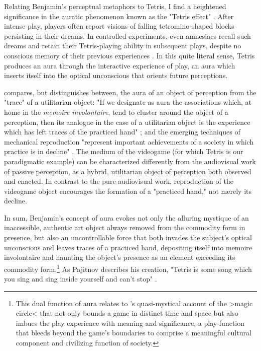 Relating Benjamin's perceptual metaphors to Tetris, I find a heightened significance in the auratic phenomenon known as the "Tetris effect" \autocite{Goldsmith1994}. After intense play, players often report visions of falling tetromino-shaped blocks persisting in their dreams. In controlled experiments, even amnesiacs recall such dreams and retain their Tetris-playing ability in subsequent plays, despite no conscious memory of their previous experiences \autocite{Stickgold2000-mv}. In this quite literal sense, Tetris produces an aura through the interactive experience of play, an aura which inserts itself into the optical unconscious that orients future perceptions.

\citeauthor{Benjamin1969-ed} compares, but distinguishes between, the aura of an object of perception from the "trace" of a utilitarian object: "If we designate as aura the associations which, at home in the \emph{memoire involontaire}, tend to cluster around the object of a perception, then its analogue in the case of a utilitarian object is the experience which has left traces of the practiced hand" \autocite[186]{Benjamin1969-ed}; and the emerging techniques of mechanical reproduction "represent important achievements of a society in which practice is in decline" \autocite[186]{Benjamin1969-ed}. The medium of the videogame (for which Tetris is our paradigmatic example) can be characterized differently from the audiovisual work of passive perception, as a hybrid, utilitarian object of perception both observed and enacted. In contrast to the pure audiovisual work, reproduction of the videogame object encourages the formation of a "practiced hand," not merely its decline.

In sum, Benjamin's concept of aura evokes not only the alluring mystique of an inaccessible, authentic art object always removed from the commodity form in presence, but also an uncontrollable force that both invades the subject's optical unconscious and leaves traces of a practiced hand, depositing itself into memoire involontaire and haunting the object's presence as an element exceeding its commodity form.\footnote{
  This dual function of aura relates to \citeauthor{Huizinga1971}'s quasi-mystical account of the >magic circle< that not only bounds a game in distinct time and space but also imbues the play experience with meaning and significance, a play-function that bleeds beyond the game's boundaries to comprise a meaningful cultural component and civilizing function of society.
}
As Pajitnov describes his creation, "Tetris is some song which you sing and sing inside yourself and can't stop" \autocite[qtd. in][]{Goldsmith1994}.

